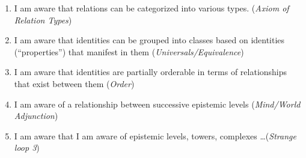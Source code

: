 \documentclass[pra,twocolumn,groupedaddress,10pt]{revtex4}
\theoremstyle{definition}
\begin{document}
\begin{enumerate}[label={[\textbf{\arabic*}]},start=0]
	\item \begin {enumerate}
			\item I am aware that relations can be categorized into various types. (\emph{Axiom of Relation Types})
			\item I am aware that identities can be grouped into classes based on identities (``properties'') that manifest in them (\emph{Universals/Equivalence})
			\item I am aware that identities are partially orderable in terms of relationships that exist between them (\emph{Order})
			\item I am aware of a relationship between successive epistemic levels (\emph{Mind/World Adjunction})
			\item I am aware that I am aware of epistemic levels, towers, complexes \ldots (\emph{Strange loop 3})
		\end{enumerate}


\end{enumerate}
\end{document}
